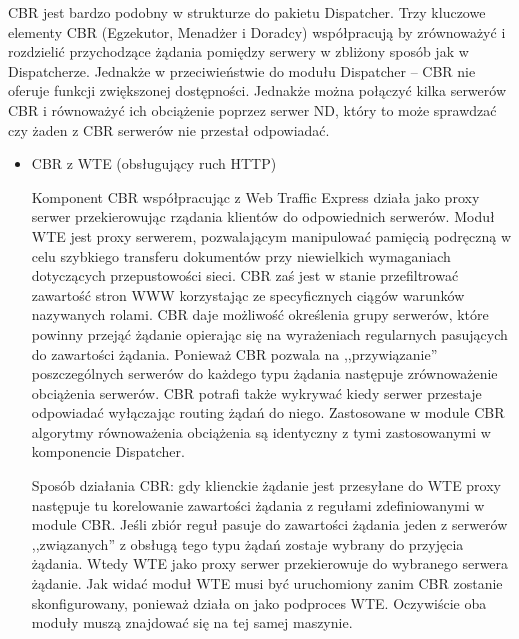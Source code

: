 CBR jest bardzo podobny w strukturze do pakietu Dispatcher. Trzy kluczowe elementy CBR (Egzekutor, Menadżer i Doradcy) 
współpracują by zrównoważyć i rozdzielić przychodzące żądania pomiędzy serwery w zbliżony sposób jak w Dispatcherze. 
Jednakże w przeciwieństwie do modułu Dispatcher -- CBR nie oferuje funkcji zwiększonej dostępności. Jednakże można połączyć 
kilka serwerów CBR i równoważyć ich obciążenie poprzez serwer ND, który to może sprawdzać czy żaden z CBR serwerów nie 
przestał odpowiadać.

\begin{itemize}
\item CBR z WTE (obsługujący ruch HTTP)

Komponent CBR współpracując z Web Traffic Express działa jako proxy serwer przekierowując rządania klientów do odpowiednich
serwerów. Moduł WTE jest proxy serwerem, pozwalającym manipulować pamięcią podręczną w celu szybkiego transferu dokumentów
przy niewielkich wymaganiach dotyczących przepustowości sieci. CBR zaś jest w stanie przefiltrować zawartość stron WWW 
korzystając ze specyficznych ciągów warunków nazywanych rolami. CBR daje możliwość określenia grupy serwerów, które powinny
przejąć żądanie opierając się na wyrażeniach regularnych pasujących do zawartości żądania. Ponieważ CBR pozwala na
,,przywiązanie'' poszczególnych serwerów do każdego typu żądania następuje zrównoważenie obciążenia serwerów. CBR potrafi
także wykrywać kiedy serwer przestaje odpowiadać wyłączając routing żądań do niego. Zastosowane w module CBR algorytmy
równoważenia obciążenia są identyczny z tymi zastosowanymi w komponencie Dispatcher. 

Sposób działania CBR: gdy klienckie żądanie jest przesyłane do WTE proxy następuje tu korelowanie zawartości żądania
z regułami zdefiniowanymi w module CBR. Jeśli zbiór reguł pasuje do zawartości żądania jeden z serwerów ,,związanych'' z 
obsługą tego typu żądań zostaje wybrany do przyjęcia żądania. Wtedy WTE jako proxy serwer przekierowuje do wybranego serwera 
żądanie. Jak widać moduł WTE musi być uruchomiony zanim CBR zostanie skonfigurowany, ponieważ działa on jako podproces WTE.
Oczywiście oba moduły muszą znajdować się na tej samej maszynie.


\end{itemize}

